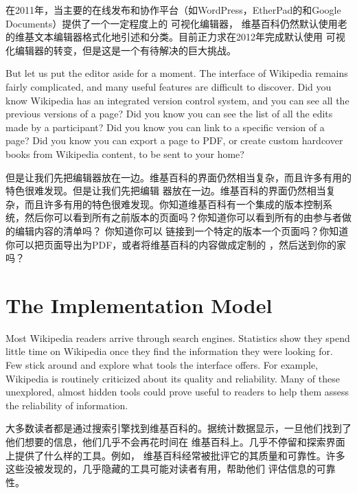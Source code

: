 在2011年，当主要的在线发布和协作平台（如WordPress，EtherPad的和Google Documents）提供了一个一定程度上的
可视化编辑器， 维基百科仍然默认使用老的维基文本编辑器格式化地引述和分类。目前正力求在2012年完成默认使用
可视化编辑器的转变，但是这是一个有待解决的巨大挑战。

But let us put the editor aside for a moment. The interface of Wikipedia remains
fairly complicated, and many useful features are difficult to discover. Did you
know Wikipedia has an integrated version control system, and you can see all
the previous versions of a page? Did you know you can see the list of all the
edits made by a participant? Did you know you can link to a specific version
of a page? Did you know you can export a page to PDF, or create custom
hardcover books from Wikipedia content, to be sent to your home?

但是让我们先把编辑器放在一边。维基百科的界面仍然相当复杂，而且许多有用的特色很难发现。但是让我们先把编辑
器放在一边。维基百科的界面仍然相当复杂，而且许多有用的特色很难发现。你知道维基百科有一个集成的版本控制系
统，然后你可以看到所有之前版本的页面吗？你知道你可以看到所有的由参与者做的编辑内容的清单吗？ 你知道你可以
链接到一个特定的版本一个页面吗？你知道你可以把页面导出为PDF，或者将维基百科的内容做成定制的 
，然后送到你的家吗？

\section*{The Implementation Model}

Most Wikipedia readers arrive through search engines. Statistics show they spend
little time on Wikipedia once they find the information they were looking for.
Few stick around and explore what tools the interface offers. For example,
Wikipedia is routinely criticized about its quality and reliability. Many of
these unexplored, almost hidden tools could prove useful to readers to help them
assess the reliability of information.

大多数读者都是通过搜索引擎找到维基百科的。据统计数据显示，一旦他们找到了他们想要的信息，他们几乎不会再花时间在
维基百科上。几乎不停留和探索界面上提供了什么样的工具。例如， 维基百科经常被批评它的其质量和可靠性。许多 
这些没被发现的，几乎隐藏的工具可能对读者有用，帮助他们 评估信息的可靠性。

